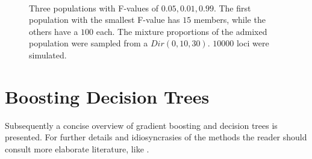 \documentclass[a4paper, 11pt]{article}
\begin{document}
\begin{figure}[h!]
\\Three populations with F-values  of $0.05, 0.01, 0.99$. The first population with the smallest F-value has $15$ members, while the others have a $100$ each. The mixture proportions of the admixed population were sampled from a $Dir(0, 10, 30)$. $10000$ loci were simulated.

\centering
\end{figure}


\newpage









\section{Boosting Decision Trees}
Subsequently a concise overview of gradient boosting and decision trees is presented. For further details and idiosyncrasies of the methods the reader should consult more elaborate literature, like \cite{trevor2009elements}.
\end{document}
